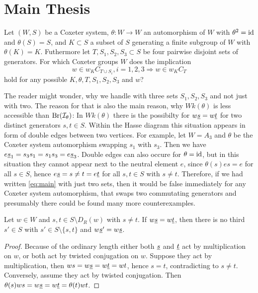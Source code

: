 \section{Main Thesis}
\label{sec:main-thesis}

\begin{ques}
	Let $(W,S)$ be a Coxeter system, $\theta : W \to W$ an automorphism of $W$ with $\theta^2 = \operatorname{id}$ and $\theta(S) = S$, and $K \subset S$ a subset of $S$ generating a finite subgroup of $W$ with $\theta(K) = K$. Futhermore let $T,S_1,S_2,S_3 \subset S$ be four pairwise disjoint sets of generators. For which Coxeter groups $W$ does the implication
	\begin{equation}
		\label{eq:main}
		w \in w_K C_{T \cup S_i}, i=1,2,3 \Rightarrow w \in w_K C_T
	\end{equation}
	hold for any possible $K,\theta,T,S_1,S_2,S_3$ and $w$?
\end{ques}

The reader might wonder, why we handle with three sets $S_1,S_2,S_3$ and not just with two. The reason for that is also the main reason, why $Wk(\theta)$ is less accessible than $\operatorname{Br}(\mathcal{I}_{\theta})$: In $Wk(\theta)$ there is the possibilty for $w \underline{s} = w \underline{t}$ for two distinct generators $s,t \in S$. Within the Hasse diagram this situation appears in form of double edges between two vertices. For example, let $W = A_3$ and $\theta$ be the Coxeter system automorphism swapping $s_1$ with $s_3$. Then we have $e \underline{s}_1 = s_3 s_1 = s_1 s_3 = e \underline{s}_3$. Double edges can also occure for $\theta = \operatorname{id}$, but in this situation they cannot appear next to the neutral element $e$, since $\theta(s)es = e$ for all $s \in S$, hence $e \underline{s} = s \neq t = e \underline{t}$ for all $s,t \in S$ with $s \neq t$. Therefore, if we had written \ref{eq:main} with just two sets, then it would be false immediately for any Coxeter system automorphism, that swaps two commutating generators and presumably there could be found many more counterexamples.

\begin{prop}
	Let $w \in W$ and $s,t \in S \setminus D_R(w)$ with $s \neq t$. If $w \underline{s} = w \underline{t}$, then there is no third $s' \in S$ with $s' \in S \setminus \{s,t\}$ and $w \underline{s}' = w \underline{s}$.

	\begin{proof}
		Because of the ordinary length either both $\underline{s}$ and $\underline{t}$ act by multiplication on $w$, or both act by twisted conjugation on $w$. Suppose they act by multiplication, then $ws = w \underline{s} = w \underline{t} = wt$, hence $s = t$, contradicting to $s \neq t$. Conversely, assume they act by twisted conjugation. Then $\theta(s)ws = w \underline{s} = w \underline{t} = \theta(t)wt$. \todo
	\end{proof}
\end{prop}

